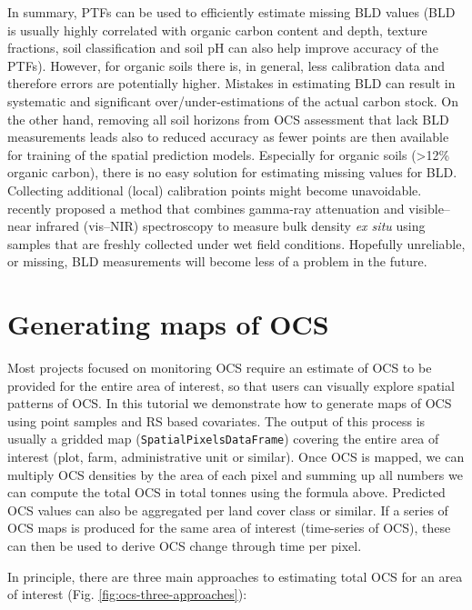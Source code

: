 \documentclass[graybox,natbib,nospthms,UStrade]{svmono}
\begin{document}
In summary, PTFs can be used to efficiently estimate missing BLD values (BLD is usually highly correlated with organic carbon content and depth, texture fractions, soil classification and soil pH can also help improve accuracy of the PTFs). However, for organic soils there is, in general, less calibration data and therefore errors are potentially higher. Mistakes in estimating BLD can result in systematic and significant over/under-estimations of the actual carbon stock. On the other hand, removing all soil horizons from OCS assessment that lack BLD measurements leads also to reduced accuracy as fewer points are then available for training of the spatial prediction models. Especially for organic soils (\textgreater{}12\% organic carbon), there is no easy solution for estimating missing values for BLD. Collecting additional (local) calibration points might become unavoidable. \citet{lobsey2016sensing} recently proposed a method that combines gamma-ray attenuation and visible--near infrared (vis--NIR) spectroscopy to measure bulk density \emph{ex situ} using samples that are freshly collected under wet field conditions. Hopefully unreliable, or missing, BLD measurements will become less of a problem in the future.

\hypertarget{generating-maps-of-ocs}{%
\section{Generating maps of OCS}\label{generating-maps-of-ocs}}

Most projects focused on monitoring OCS require an estimate of OCS to be provided for the entire area of interest, so that users can visually explore spatial patterns of OCS. In this tutorial we demonstrate how to generate maps of OCS using point samples and RS based covariates. The output of this process is usually a gridded map (\texttt{SpatialPixelsDataFrame}) covering the entire area of interest (plot, farm, administrative unit or similar). Once OCS is mapped, we can multiply OCS densities by the area of each pixel and summing up all numbers we can compute the total OCS in total tonnes using the formula above. Predicted OCS values can also be aggregated per land cover class or similar. If a series of OCS maps is produced for the same area of interest (time-series of OCS), these can then be used to derive OCS change through time per pixel.

In principle, there are three main approaches to estimating total OCS for an area of interest (Fig. \ref{fig:ocs-three-approaches}):
\end{document}
